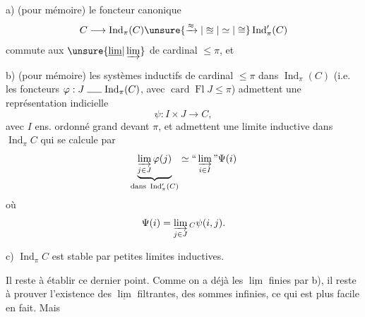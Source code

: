 a) (pour mémoire) le foncteur canonique
\[
C\longrightarrow\operatorname{Ind}_{\pi}(C)\unsure{\xrightarrow{\approx}|\approxeq|\simeq|\cong}\operatorname{Ind}'_{\pi}(C)
\]
commute aux $\unsure{\underline{\lim}|\varinjlim}$ de cardinal $\leq\pi$, et

b) (pour mémoire) les systèmes inductifs de cardinal $\leq\pi$ dans $\operatorname{Ind}_{\pi}(C)$ (i.e. les foncteurs $\varphi:J\mathrel{\rule{1.5em}{0.4pt}}\operatorname{Ind}_{\pi}(C)$, avec $\operatorname{card}\operatorname{Fl}J\leq\pi$) admettent une représentation indicielle
\[
\psi:I\times J\longrightarrow C,
\]
avec $I$ ens. ordonné grand devant $\pi$, et admettent une limite inductive dans $\operatorname{Ind}_{\pi}C$ qui se calcule par
\[
\underbrace{\varinjlim_{j\in J}\varphi(j)}_{\text{dans }\operatorname{Ind}'_{\pi}(C)}\simeq\text{``}\varinjlim_{i\in I}\text{''}\Psi(i)
\]
où
\[
\Psi(i)=\varinjlim_{j\in J}{}_{C}\psi(i,j).
\]

c) $\operatorname{Ind}_{\pi}C$ est stable par petites limites inductives.


Il reste à établir ce dernier point. Comme on a déjà les $\underline{\lim}$ finies par b), il reste à prouver l'existence des  $\underline{\lim}$ filtrantes,    des sommes infinies, ce qui est plus facile en fait. Mais
